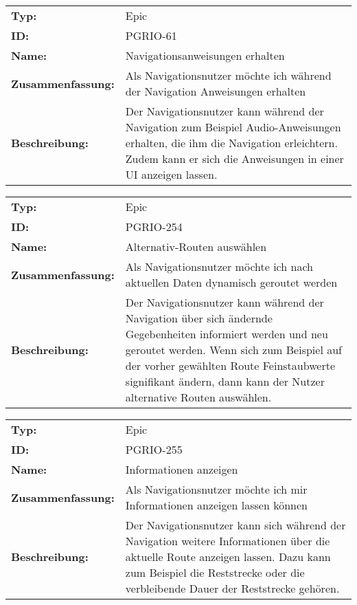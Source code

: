		\begin{flushleft} 
\begin{tabular}{@{}lp{100mm}} 
\textbf{Typ:} & Epic \\ 
\textbf{ID:} & PGRIO-61 \\ 
\textbf{Name:} & Navigationsanweisungen erhalten \\ 
\textbf{Zusammenfassung:} & Als Navigationsnutzer möchte ich während der Navigation Anweisungen erhalten \\ 
\textbf{Beschreibung:} & Der Navigationsnutzer kann während der Navigation zum Beispiel Audio-Anweisungen erhalten, die ihm die Navigation erleichtern. Zudem kann er sich die Anweisungen in einer UI anzeigen lassen. \\ 
\end{tabular} 
\end{flushleft} 

		\begin{flushleft} 
\begin{tabular}{@{}lp{100mm}} 
\textbf{Typ:} & Epic \\ 
\textbf{ID:} & PGRIO-254 \\ 
\textbf{Name:} & Alternativ-Routen auswählen \\ 
\textbf{Zusammenfassung:} & Als Navigationsnutzer möchte ich nach aktuellen Daten dynamisch geroutet werden \\ 
\textbf{Beschreibung:} & Der Navigationsnutzer kann während der Navigation über sich ändernde Gegebenheiten informiert werden und neu geroutet werden. Wenn sich zum Beispiel auf der vorher gewählten Route Feinstaubwerte signifikant ändern, dann kann der Nutzer alternative Routen auswählen. \\ 
\end{tabular} 
\end{flushleft} 

		\begin{flushleft} 
\begin{tabular}{@{}lp{100mm}} 
\textbf{Typ:} & Epic \\ 
\textbf{ID:} & PGRIO-255 \\ 
\textbf{Name:} & Informationen anzeigen \\ 
\textbf{Zusammenfassung:} & Als Navigationsnutzer möchte ich mir Informationen anzeigen lassen können \\ 
\textbf{Beschreibung:} & Der Navigationsnutzer kann sich während der Navigation weitere Informationen über die aktuelle Route anzeigen lassen. Dazu kann zum Beispiel die Reststrecke oder die verbleibende Dauer der Reststrecke gehören. \\ 
\end{tabular} 
\end{flushleft} 

